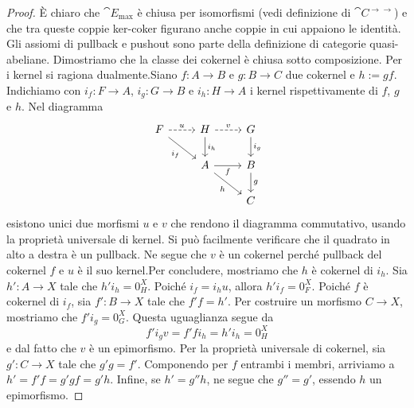 \begin{proof}
  È chiaro che $\cat E_{\max}$ è chiusa per isomorfismi (vedi
  definizione di \(\cat C^{\to\to}\)) e che tra queste coppie ker-coker
  figurano anche coppie in cui appaiono le identità. Gli assiomi di
  pullback e pushout sono parte della definizione di categorie
  quasi-abeliane. Dimostriamo che la classe dei cokernel è chiusa sotto
  composizione. Per i kernel si ragiona dualmente.\newline Siano
  $f: A \to B$ e $g: B \to C$ due cokernel e $h := gf$. Indichiamo con
  \(i_f : F \to A\), \(i_g : G \to B\) e \(i_h : H \to A\) i kernel
  rispettivamente di \(f\), \(g\) e \(h\). Nel diagramma
  \[
    \begin{tikzcd}
      F \ar["{i_f}", dr, swap] \ar["{u}", r, dashed] & H \ar["{i_h}", d]
      \ar["{v}", r, dashed] &
      G \ar["{i_g}", d] \\
      & A \ar["{h}", dr, swap] \ar["{f}", r, swap] & B \ar["{g}", d] \\
      & & C
    \end{tikzcd}
  \]
  esistono unici due morfismi $u$ e $v$ che rendono il diagramma
  commutativo, usando la proprietà universale di kernel. Si può
  facilmente verificare che il quadrato in alto a destra è un
  pullback. Ne segue che \(v\) è un cokernel perché pullback del
  cokernel \(f\) e $u$ è il suo kernel.\newline Per concludere,
  mostriamo che \(h\) è cokernel di \(i_h\). Sia \(h' : A \to X\) tale
  che \(h'i_h = 0_H^X\). Poiché \(i_f = i_h u\), allora
  \(h'i_f = 0_F^X\). Poiché \(f\) è cokernel di \(i_f\), sia
  \(f' : B \to X\) tale che \(f'f = h'\). Per costruire un morfismo
  \(C \to X\), mostriamo che \(f' i_g = 0_G^X\). Questa uguaglianza
  segue da
  \[
    f' i_g v = f' f i_h = h' i_h = 0_H^X
  \]
  e dal fatto che \(v\) è un epimorfismo. Per la proprietà universale di
  cokernel, sia \(g' : C \to X\) tale che \(g' g = f'\). Componendo per
  \(f\) entrambi i membri, arriviamo a \(h' = f'f = g'gf =
  g'h\). Infine, se \(h' = g''h\), ne segue che \(g'' = g'\), essendo
  \(h\) un epimorfismo.
\end{proof}






